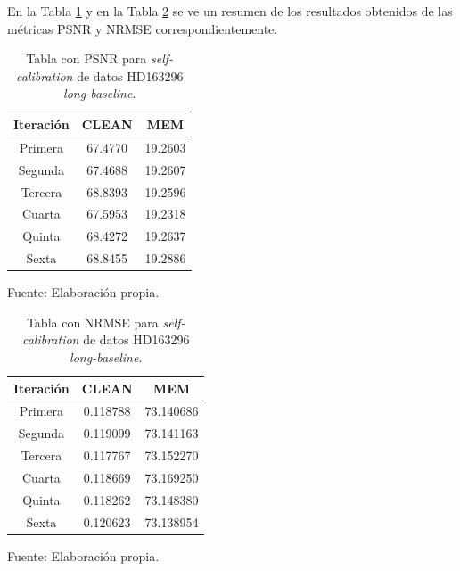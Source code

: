 En la Tabla \ref{tab:real_long_selfcal_psnr} y en la Tabla \ref{tab:real_long_selfcal_nrmse} se ve un resumen de los resultados obtenidos de las métricas PSNR y NRMSE correspondientemente.

\begin{table}[!ht]
	\begin{center}
		\caption{Tabla con PSNR para \textit{self-calibration} de datos HD163296 \textit{long-baseline}.}
		\begin{tabular}{| c | c | c |}
			\hline
			Iteración & CLEAN & MEM\\ \hline
			Primera & 67.4770 & 19.2603\\ \hline
            Segunda & 67.4688 & 19.2607\\ \hline
            Tercera & 68.8393 & 19.2596\\ \hline
            Cuarta & 67.5953 & 19.2318\\ \hline
            Quinta & 68.4272 & 19.2637\\ \hline
            Sexta & 68.8455 & 19.2886\\ \hline
		\end{tabular}
		\label{tab:real_long_selfcal_psnr}
	\end{center}
	\begin{center}
		Fuente: Elaboración propia.
	\end{center}
\end{table}

\begin{table}[!ht]
	\begin{center}
		\caption{Tabla con NRMSE para \textit{self-calibration} de datos HD163296 \textit{long-baseline}.}
		\begin{tabular}{| c | c | c |}
			\hline
			Iteración & CLEAN & MEM\\ \hline
			Primera & 0.118788 & 73.140686\\ \hline
            Segunda & 0.119099 & 73.141163\\ \hline
            Tercera & 0.117767 & 73.152270\\ \hline
            Cuarta & 0.118669 & 73.169250\\ \hline
            Quinta & 0.118262 & 73.148380\\ \hline
            Sexta & 0.120623 & 73.138954\\ \hline
		\end{tabular}
		\label{tab:real_long_selfcal_nrmse}
	\end{center}
	\begin{center}
		Fuente: Elaboración propia.
	\end{center}
\end{table}


